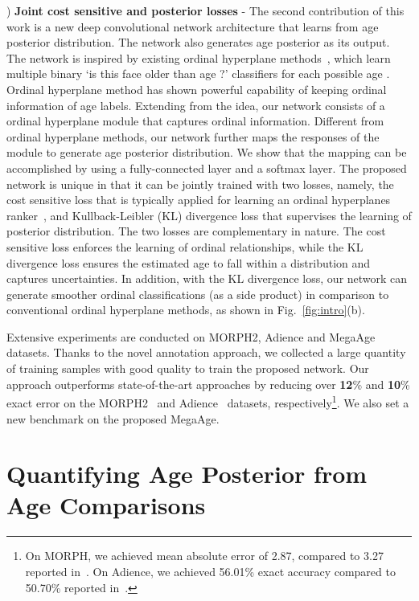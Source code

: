\documentclass{bmvc2k}
\begin{document}
) \textbf{Joint cost sensitive and posterior losses} -
The second contribution of this work is a new deep convolutional network architecture that learns from age posterior distribution. The network also generates age posterior as its output.
The network is inspired by existing ordinal hyperplane methods~\cite{chang2011ordinal,li2012learning,niu2016ordinal}, which learn multiple binary `is this face older than age ?' classifiers for each possible age . Ordinal hyperplane method has shown powerful capability of keeping ordinal information of age labels. 
Extending from the idea, our network consists of a ordinal hyperplane module that captures ordinal information.
Different from ordinal hyperplane methods, our network further maps the responses of the module to generate age posterior distribution. We show that the mapping can be accomplished by using a fully-connected layer and a softmax layer. 
The proposed network is unique in that it can be jointly trained with two losses, namely, the cost sensitive loss that is typically applied for learning an ordinal hyperplanes ranker~\cite{chang2011ordinal}, and Kullback-Leibler (KL) divergence loss that supervises the learning of posterior distribution. The two losses are complementary in nature. The cost sensitive loss enforces the learning of ordinal relationships, while the KL divergence loss ensures the estimated age to fall within a distribution and captures uncertainties. In addition, with the KL divergence loss, our network can generate smoother ordinal classifications (as a side product) in comparison to conventional ordinal hyperplane methods, as shown in Fig.~\ref{fig:intro}(b).

Extensive experiments are conducted on MORPH2, Adience and MegaAge datasets. Thanks to the novel annotation approach, we collected a large quantity of training samples with good quality to train the proposed network. Our approach outperforms state-of-the-art approaches by reducing over \textbf{12}\% and \textbf{10}\% exact error on the MORPH2~\cite{niu2016ordinal} and Adience~\cite{levi2015age} datasets, respectively\footnote{On MORPH, we achieved mean absolute error of 2.87, compared to 3.27 reported in~\cite{niu2016ordinal}. On Adience, we achieved 56.01\% exact accuracy compared to 50.70\% reported in~\cite{levi2015age}.}. We also set a new benchmark on the proposed MegaAge.   

\vspace{-0.15cm}



\section{Quantifying Age Posterior from Age Comparisons}
\label{sec:age_posterior}
\end{document}
